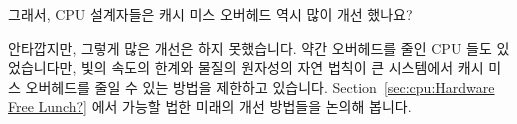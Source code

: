 \QuickQ{}
	그래서, CPU 설계자들은 캐시 미스 오버헤드 역시 많이 개선 했나요?

\QuickA{}
	안타깝지만, 그렇게 많은 개선은 하지 못했습니다.
	약간 오버헤드를 줄인 CPU 들도 있었습니다만, 빛의 속도의 한계와 물질의
	원자성의 자연 법칙이 큰 시스템에서 캐시 미스 오버헤드를 줄일 수 있는
	방법을 제한하고 있습니다.
	Section~\ref{sec:cpu:Hardware Free Lunch?} 에서 가능할 법한 미래의 개선
	방법들을 논의해 봅니다.

